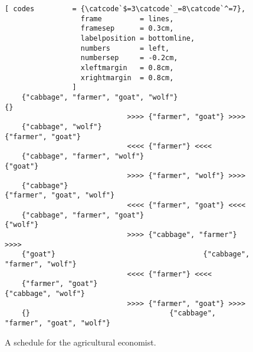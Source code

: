 \begin{figure}[!ht]
  \centering
\begin{Verbatim}[ codes         = {\catcode`$=3\catcode`_=8\catcode`^=7},
                  frame         = lines, 
                  framesep      = 0.3cm, 
                  labelposition = bottomline,
                  numbers       = left,
                  numbersep     = -0.2cm,
                  xleftmargin   = 0.8cm,
                  xrightmargin  = 0.8cm,
                ]
    {"cabbage", "farmer", "goat", "wolf"}                                 {}
                             >>>> {"farmer", "goat"} >>>> 
    {"cabbage", "wolf"}                                   {"farmer", "goat"}
                             <<<< {"farmer"} <<<< 
    {"cabbage", "farmer", "wolf"}                                   {"goat"}
                             >>>> {"farmer", "wolf"} >>>> 
    {"cabbage"}                                   {"farmer", "goat", "wolf"}
                             <<<< {"farmer", "goat"} <<<< 
    {"cabbage", "farmer", "goat"}                                   {"wolf"}
                             >>>> {"cabbage", "farmer"} >>>> 
    {"goat"}                                   {"cabbage", "farmer", "wolf"}
                             <<<< {"farmer"} <<<< 
    {"farmer", "goat"}                                   {"cabbage", "wolf"}
                             >>>> {"farmer", "goat"} >>>> 
    {}                                 {"cabbage", "farmer", "goat", "wolf"}
\end{Verbatim} 
\vspace*{-0.3cm}
\caption{A schedule for the agricultural economist.}  
\label{fig:wolf-ziege-solution}
\end{figure}



